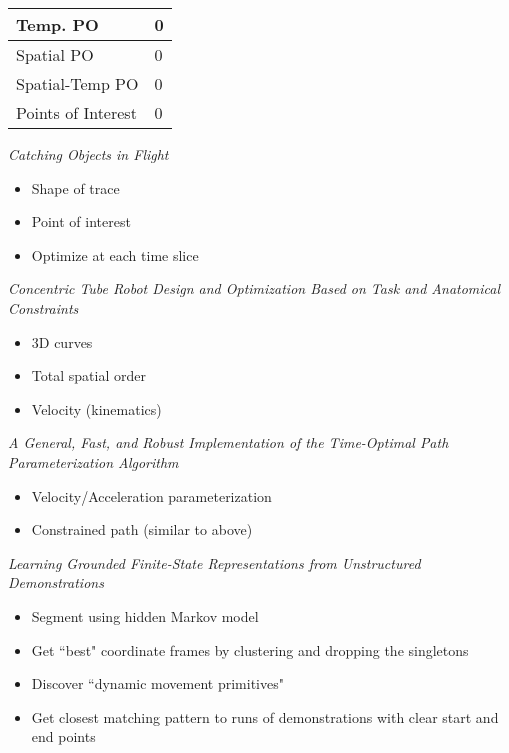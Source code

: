 \documentclass[12pt]{article}
\begin{document}
\begin{table}[h]
\begin{tabular}{|l|l|}
\hline
Temp. PO &  0\\ \hline
Spatial PO & 0  \\ \hline
Spatial-Temp PO & 0 \\ \hline
Points of Interest & 0 \\ \hline
\end{tabular}
\end{table}

{\sl Catching Objects in Flight}
\cite{kim2014catching}
\smallskip
\begin{itemize}
  \item Shape of trace
  \item Point of interest
  \item Optimize at each time slice
\end{itemize}

{\sl Concentric Tube Robot Design and Optimization
Based on Task and Anatomical Constraints}
\cite{bergelesconcentric}
\smallskip
\begin{itemize}
  \item 3D curves
  \item Total spatial order
  \item Velocity (kinematics)
\end{itemize}

{\sl A General, Fast, and Robust Implementation of the
Time-Optimal Path Parameterization Algorithm}
\cite{pham2014general}
\smallskip
\begin{itemize}
  \item Velocity/Acceleration parameterization
  \item Constrained path (similar to above)
\end{itemize}

{\sl Learning Grounded Finite-State Representations
from Unstructured Demonstrations}
\cite{niekum2014learning}
\smallskip
\begin{itemize}
  \item Segment using hidden Markov model
  \item Get ``best" coordinate frames by clustering
        and dropping the singletons
  \item Discover ``dynamic movement primitives"
  \item Get closest matching pattern to runs of
        demonstrations with clear start and end points
\end{itemize}



\end{document}
